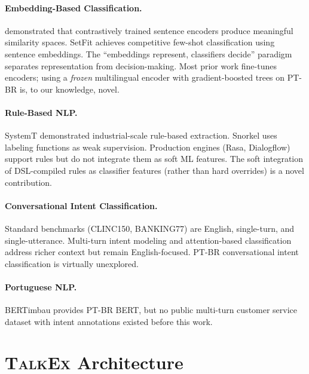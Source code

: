 \documentclass[11pt]{article}
\newcommand{\talkex}{\textsc{TalkEx}}
\begin{document}
\paragraph{Embedding-Based Classification.} \citet{reimers2019sentencebert} demonstrated that contrastively trained sentence encoders produce meaningful similarity spaces. SetFit \citep{tunstall2022setfit} achieves competitive few-shot classification using sentence embeddings. The ``embeddings represent, classifiers decide'' paradigm \citep{anthusai2024embeddings} separates representation from decision-making. Most prior work fine-tunes encoders; using a \emph{frozen} multilingual encoder with gradient-boosted trees on PT-BR is, to our knowledge, novel.

\paragraph{Rule-Based NLP.} SystemT \citep{chiticariu2013systemT} demonstrated industrial-scale rule-based extraction. Snorkel \citep{ratner2017snorkel} uses labeling functions as weak supervision. Production engines (Rasa, Dialogflow) support rules but do not integrate them as soft ML features. The soft integration of DSL-compiled rules as classifier features (rather than hard overrides) is a novel contribution.

\paragraph{Conversational Intent Classification.} Standard benchmarks (CLINC150, BANKING77) are English, single-turn, and single-utterance. Multi-turn intent modeling \citep{zhang2021multi} and attention-based classification \citep{lyu2025attention} address richer context but remain English-focused. PT-BR conversational intent classification is virtually unexplored.

\paragraph{Portuguese NLP.} BERTimbau \citep{souza2020bertimbau} provides PT-BR BERT, but no public multi-turn customer service dataset with intent annotations existed before this work.


\section{\talkex{} Architecture}
\label{sec:architecture}
\end{document}
